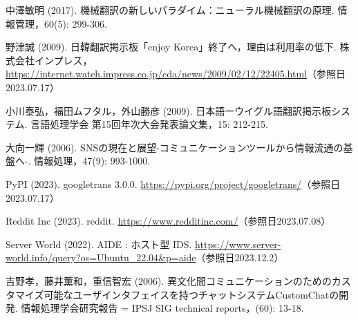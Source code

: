 \documentclass[b5paper,12pt,dvipdfmx]{jsreport}
\begin{document}
\begin{thebibliography}{99}
中澤敏明 (2017). 機械翻訳の新しいパラダイム：ニューラル機械翻訳の原理. 情報管理，60(5): 299-306.

野津誠 (2009). 日韓翻訳掲示板「enjoy Korea」終了へ，理由は利用率の低下. 株式会社インプレス，\url{https://internet.watch.impress.co.jp/cda/news/2009/02/12/22405.html}（参照日2023.07.17）

小川泰弘，福田ムフタル，外山勝彦 (2009). 日本語ーウイグル語翻訳掲示板システム. 言語処理学会 第15回年次大会発表論文集，15: 212-215.

大向一輝 (2006). SNSの現在と展望-コミュニケーションツールから情報流通の基盤へ-. 情報処理，47(9): 993-1000.


PyPI (2023). googletrans 3.0.0. \url{https://pypi.org/project/googletrans/}（参照日2023.07.17）

Reddit Inc (2023). reddit. \url{https://www.redditinc.com/}（参照日2023.07.08）

Server World (2022). AIDE : ホスト型 IDS. \url{https://www.server-world.info/query?os=Ubuntu_22.04&p=aide}（参照日2023.12.2）

吉野孝，藤井薫和，重信智宏 (2006). 異文化間コミュニケーションのためのカスタマイズ可能なユーザインタフェイスを持つチャットシステムCustomChatの開発. 情報処理学会研究報告 = IPSJ SIG technical reports，(60): 13-18.



\end{thebibliography}
    
\end{document}
